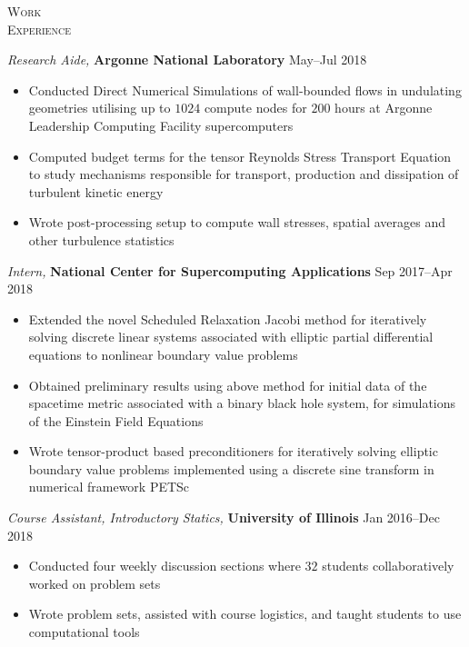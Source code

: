 \documentclass[10pt]{article}
\begin{document}
\begin{multicols}{2}
\textsc{\small Work \\ Experience}
\columnbreak

{\sl Research Aide,} \textbf{Argonne National Laboratory} \hfill May--Jul 2018

\vspace{-2.0em}
\begin{itemize}[label=-]
    \setlength\itemsep{-0.25em}
    \item Conducted Direct Numerical Simulations of wall-bounded flows in undulating geometries utilising up to $1024$ compute nodes for $200$ hours at Argonne Leadership Computing Facility supercomputers
    \item Computed budget terms for the tensor Reynolds Stress Transport Equation to study mechanisms responsible for transport, production and dissipation of turbulent kinetic energy%
    \item Wrote post-processing setup to compute wall stresses, spatial averages and other turbulence statistics
\end{itemize}
\vspace{-2.0em}
%
\vspace{0.5em}
%
{\sl Intern,} \textbf{National Center for Supercomputing Applications} \hfill Sep 2017--Apr 2018

\vspace{-2.0em}
\begin{itemize}[label=-]
    \setlength\itemsep{-0.25em}
    \item Extended the novel Scheduled Relaxation Jacobi method for iteratively solving discrete linear systems associated with elliptic partial differential equations to nonlinear boundary value problems
    \item Obtained preliminary results using above method for initial data of the spacetime metric associated with a binary black hole system, for simulations of the Einstein Field Equations
    \item Wrote tensor-product based preconditioners for iteratively solving elliptic boundary value problems implemented using a discrete sine transform in numerical framework PETSc
\end{itemize}
\vspace{-2.0em}
%
\vspace{0.5em}
%
{\sl Course Assistant, Introductory Statics,} \textbf{University of Illinois} \hfill Jan 2016--Dec 2018

\vspace{-2.0em}
\begin{itemize}[label=-]
    \setlength\itemsep{-0.25em}
    \item Conducted four weekly discussion sections where $32$ students collaboratively worked on problem sets
    \item Wrote problem sets, assisted with course logistics, and taught students to use computational tools
\end{itemize}
\vspace{-2.0em}

\end{multicols}
\end{document}
